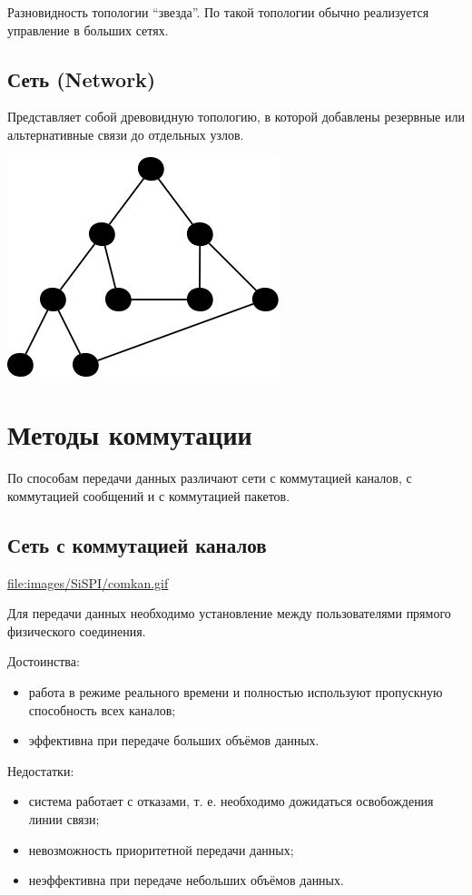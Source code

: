 \documentclass[12pt, russian, oneside, article]{ncc}
\begin{document}
Разновидность топологии ``звезда''. По такой топологии обычно реализуется управление в больших сетях.
\subsection{Сеть (Network)}
\label{sec-2_5}


Представляет собой древовидную топологию, в которой добавлены резервные или альтернативные связи до отдельных узлов.

\includegraphics[]{images/SiSPI/network.png}
\section{Методы коммутации}
\label{sec-3}


По способам передачи данных различают сети с коммутацией каналов, с коммутацией сообщений и с коммутацией пакетов.
\subsection{Сеть с коммутацией каналов}
\label{sec-3_1}


\href{file://~/Documents/Git/lectures/otherimages/SiSPI/comkan.gif}{file:images/SiSPI/comkan.gif}

Для передачи данных необходимо установление между пользователями прямого физического соединения.

Достоинства:
\begin{itemize}
\item работа в режиме реального времени и полностью используют пропускную способность всех каналов;
\item эффективна при передаче больших объёмов данных.
\end{itemize}

Недостатки:
\begin{itemize}
\item система работает с отказами, т. е. необходимо дожидаться освобождения линии связи;
\item невозможность приоритетной передачи данных;
\item неэффективна при передаче небольших объёмов данных.
\end{itemize}
\end{document}
